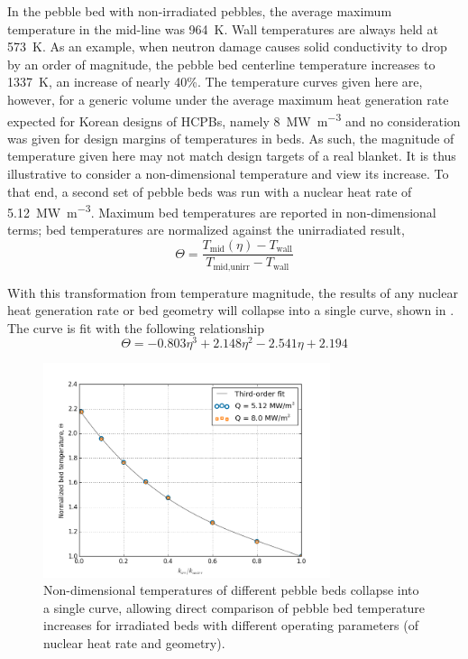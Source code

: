 In the pebble bed with non-irradiated pebbles, the average maximum temperature in the mid-line was \SI{964}{\kelvin}. Wall temperatures are always held at \SI{573}{\kelvin}. As an example, when neutron damage causes solid conductivity to drop by an order of magnitude, the pebble bed centerline temperature increases to \SI{1337}{\kelvin}, an increase of nearly 40\%. The temperature curves given here are, however, for a generic volume under the average maximum heat generation rate expected for Korean designs of HCPBs, namely \SI{8}{\mega\watt\per\meter\cubed} and no consideration was given for design margins of temperatures in beds. As such, the magnitude of temperature given here may not match design targets of a real blanket. It is thus illustrative to consider a non-dimensional temperature and view its increase. To that end, a second set of pebble beds was run with a nuclear heat rate of \SI{5.12}{\mega\watt\per\meter\cubed}. Maximum bed temperatures are reported in non-dimensional terms; bed temperatures are normalized against the unirradiated result,
\begin{equation}
\Theta = \frac{T_\text{mid}(\eta) - T_\text{wall}}{T_\text{mid,unirr} - T_\text{wall}}
\end{equation}

With this transformation from temperature magnitude, the results of any nuclear heat generation rate or bed geometry will collapse into a single curve, shown in . The curve is fit with the following relationship
\begin{equation}\label{eq:theta-eta-midline}
\Theta = -0.803 \eta^3 + 2.148 \eta^2 - 2.541 \eta + 2.194
\end{equation}
\begin{figure}[ht]
    \centering
    \includegraphics[width = 0.75\textwidth]{figures/irradiated/Tmid-plots-cfd-Tmid-comparison.png}
    \caption{Non-dimensional temperatures of different pebble beds collapse into a single curve, allowing direct comparison of pebble bed temperature increases for irradiated beds with different operating parameters (of nuclear heat rate and geometry).}\label{fig:irrad-Tmid-cfd-comparison}
\end{figure}

